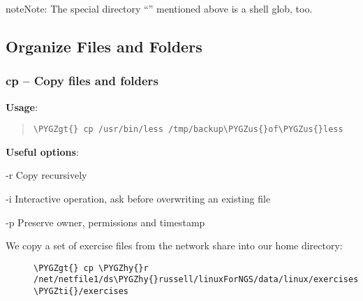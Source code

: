 \documentclass[a4paper,11pt,english]{sphinxmanual}
\def\PYGZus{\char`\_}
\def\PYGZgt{\char`\>}
\def\PYGZhy{\char`\-}
\def\PYGZti{\char`\~}
\begin{document}
\begin{notice}{note}{Note:}
The special directory “\code{\textasciitilde{}}” mentioned above is a shell glob, too.
\end{notice}


\subsection{Organize Files and Folders}
\label{introduction:organize-files-and-folders}

\subsubsection{cp – Copy files and folders}
\label{introduction:cp-copy-files-and-folders}
\textbf{Usage}:  
\begin{quote}

\begin{Verbatim}[frame=single, rulecolor=\color{lightgray}, fontfamily=courier, commandchars=\\\{\}]
\PYGZgt{} cp /usr/bin/less /tmp/backup\PYGZus{}of\PYGZus{}less
\end{Verbatim}
\end{quote}

\textbf{Useful options}:
\begin{optionlist}{3cm}
\item [-r]  
Copy recursively
\item [-i]  
Interactive operation, ask before overwriting an existing file
\item [-p]  
Preserve owner, permissions and timestamp
\end{optionlist}
\begin{description}
\item[{We copy a set of exercise files from the network share into our home directory:}] \leavevmode
\begin{Verbatim}[frame=single, rulecolor=\color{lightgray}, fontfamily=courier, commandchars=\\\{\}]
\PYGZgt{} cp \PYGZhy{}r /net/netfile1/ds\PYGZhy{}russell/linuxForNGS/data/linux/exercises  \PYGZti{}/exercises
\end{Verbatim}

\end{description}
\end{document}
